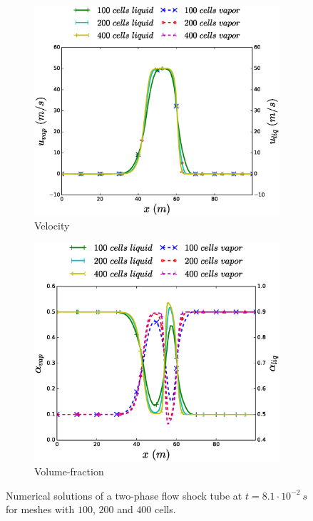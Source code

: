 \documentclass{inputs/mc2015}
\begin{document}
\begin{figure}[H]
        \begin{subfigure}[b]{0.49\textwidth}
                \centering
                \includegraphics[width=\textwidth]{figures/two-phase-shock-tube-hem-velocity-plot.eps}              
                \caption{Velocity}
                \label{fig:2p-shock-tube-plots-velocity-hem-sa}
        \end{subfigure}        
        \begin{subfigure}[b]{0.49\textwidth}
                \centering
                \includegraphics[width=\textwidth]{figures/two-phase-shock-tube-hem-vf-plot.eps}              
                \caption{Volume-fraction}
                \label{fig:2p-shock-tube-plots-vf-hem-sa}
        \end{subfigure}
        \vspace{-1 mm}        
        \caption{Numerical solutions of a two-phase flow shock tube at $t=8.1 \cdot 10^{-2} \ s$ for meshes with $100$, $200$ and $400$ cells.}\label{fig:2p-shock-tube-plots-hem-kapila}        
\end{figure}        
\end{document}
